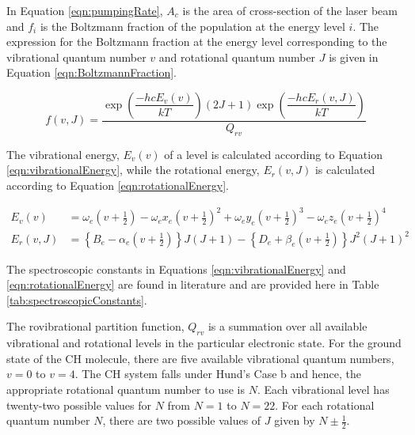

In Equation \ref{eqn:pumpingRate}, \(A_c\) is the area of cross-section of the laser beam and \(f_i\) is the Boltzmann fraction of the population at the energy level \(i\).
The expression for the Boltzmann fraction at the energy level corresponding to the vibrational quantum number \(v\) and rotational quantum number \(J\) is given in Equation \ref{eqn:BoltzmannFraction}.

\begin{equation}
  f(v,J) = \frac{ \exp{\left(\dfrac{-hcE_v(v)}{kT}\right)} (2J + 1)\exp{\left(\dfrac{-hcE_r(v, J)}{kT}\right)} }{ Q_{rv} }
  \label{eqn:BoltzmannFraction}
\end{equation}

The vibrational energy, \(E_v(v)\) of a level is calculated according to Equation \ref{eqn:vibrationalEnergy}, while the rotational energy, \(E_r(v, J)\) is calculated according to Equation \ref{eqn:rotationalEnergy}.

\begin{align}
  E_v(v) &= \omega_e \left(v+\frac{1}{2}\right) - \omega_ex_e \left(v+\frac{1}{2}\right)^2 + \omega_ey_e \left(v+\frac{1}{2}\right)^3 - \omega_ez_e \left(v+\frac{1}{2}\right)^4
  \label{eqn:vibrationalEnergy}\\
  E_r(v, J) &= \left\{B_e - \alpha_e \left(v+\frac{1}{2}\right)\right\}J(J+1) - \left\{D_e + \beta_e \left(v+\frac{1}{2}\right)\right\}J^2(J+1)^2
  \label{eqn:rotationalEnergy}
\end{align}

The spectroscopic constants in Equations \ref{eqn:vibrationalEnergy} and \ref{eqn:rotationalEnergy} are found in literature\cite{1995-zachwieja} and are provided here in Table \ref{tab:spectroscopicConstants}.



The rovibrational partition function, \(Q_{rv}\) is a summation over all available vibrational and rotational levels in the particular electronic state.
For the ground state of the CH molecule, there are five available vibrational quantum numbers, \(v = 0\) to \(v = 4\).
The CH system falls under Hund's Case b and hence, the appropriate rotational quantum number to use is \(N\).
Each vibrational level has twenty-two possible values for \(N\) from \(N = 1\) to \(N = 22\).
For each rotational quantum number \(N\), there are two possible values of \(J\) given by \(N \pm \frac{1}{2}\).

